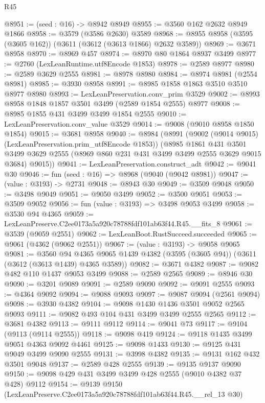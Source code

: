 \begin{lexlean}{R45}
\begin{coremodule}
@8951 := (seed : @16) -> @8942 @8949
@8955 := @3560 @162 @2632 @8949 @1866
@8958 := @3579 (@3586 @2630) @3589
@8968 := @8955 @8958 (@3595 (@3605 @162)) (@3611 (@3612 (@3613 @1866) @2632 @3589))
@8969 := @3671 @8958
@8970 := @8969 @457
@8974 := @8970 @80 @1864 @8937 @3499
@8977 := @2760 (LexLeanRuntime.utf8Encode @1853)
@8978 := @2589 @8977
@8980 := @2589 @3629 @2555
@8981 := @8978 @8980
@8984 := @8974 @8981 (@2554 @8981)
@8985 := @3930 @8958
@8991 := @8985 @1858 @1863 @3510 @3510 @8977 @8980
@8993 := LexLeanPreservation.conv_prim @3529
@9002 := @8993 @8958 @1848 @1857 @3501 @3499 (@2589 @1854 @2555) @8977
@9008 := @8985 @1855 @431 @3499 @3499 @1854 @2555
@9010 := LexLeanPreservation.conv_value @3529
@9014 := @9008 (@9010 @8958 @1850 @1854)
@9015 := @3681 @8958
@9040 := @8984
    (@8991
      (@9002 (@9014 @9015) (LexLeanPreservation.prim_utf8Encode @1853))
      (@8985
        @1861
        @431
        @3501
        @3499
        @3629
        @2555
        (@8969 @860 @231 @431 @3499 @3499 @2555 @3629 @9015 @3684)
        @9015))
@9041 := LexLeanPreservation.construct_adt
@9042 := @9041 @30
@9046 := fun (seed : @16) => @8968 (@9040 (@9042 @8981))
@9047 := (value : @3193) -> @2731
@9048 := @8943 @30
@9049 := @3509 @9048
@9050 := @3498 @9049
@9051 := @9050 @3499
@9052 := @3500 @9051
@9053 := @3509 @9052
@9056 := fun (value : @3193) => @3498 @9053 @3499
@9058 := @3530 @94 @4365
@9059 := LexLeanPreserve.C2ee0173a5a920c78788fdf101ab63f44.R45.__fits_8
@9061 := @3539 (@9059 @2551)
@9062 := LexLeanBoot.RustSucceed.succeeded
@9065 := @9061 (@4362 (@9062 @2551))
@9067 := (value : @3193) -> @9058 @9065
@9081 := @3560
    @94
    @4365
    @9065
    @1439
    @4382
    (@3595 (@3605 @94))
    (@3611 (@3612 (@3613 @1439) @4365 @3589))
@9082 := @3671 @4382
@9087 := @9082 @482 @110 @1437 @9053 @3499
@9088 := @2589 @2565
@9089 := @8946 @30
@9090 := @3201 @9089
@9091 := @2589 @9090
@9092 := @9091 @2555
@9093 := @4364 @9092
@9094 := @9088 @9093
@9097 := @9087 @9094 (@2561 @9094)
@9098 := @3930 @4382
@9104 := @9098 @1430 @1436 @3501 @9052 @2565 @9093
@9111 := @9082 @493 @104 @431 @3499 @3499 @2555 @2565
@9112 := @3681 @4382
@9113 := @9111 @9112
@9114 := @9041 @73
@9117 := @9104 (@9113 (@9114 @2555))
@9118 := @9098 @419
@9124 := @9118 @1435 @3499 @9051 @4363 @9092 @4461
@9125 := @9098 @1433
@9130 := @9125 @431 @9049 @3499 @9090 @2555
@9131 := @3998 @4382
@9135 := @9131 @162 @432 @3501 @9048
@9137 := @2589 @428 @2555
@9139 := @9135 @9137 @9090
@9150 := @9098 @429 @431 @3499 @3499 @428 @2555 (@9010 @4382 @37 @428) @9112
@9154 := @9139 @9150 (LexLeanPreserve.C2ee0173a5a920c78788fdf101ab63f44.R45.__rel_13 @30)

\end{coremodule}
\end{lexlean}
